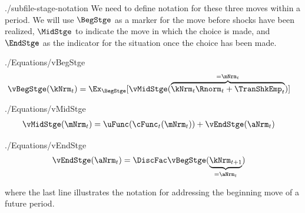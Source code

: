 \documentclass[titlepage, headings=optiontotocandhead]{\econtex}
\providecommand{\stge}{t}\renewcommand{\stge}{t}
\providecommand{\interval}{period}\renewcommand{\interval}{period}
\providecommand{\move}{move}\renewcommand{\move}{move}
\providecommand{\moves}{moves}\renewcommand{\moves}{moves}
\providecommand{\interval}{period}\renewcommand{\interval}{period}
\begin{document}
\begin{verbatimwrite}{./subfile-stage-notation}
  We need to define notation for these three {\moves} within a {\interval}. We will use $\BegStge$ as a marker for the {\move} before shocks have been realized, $\MidStge$ to indicate the move in which the choice is made, and $\EndStge$ as the indicator for the situation once the choice has been made.
\end{verbatimwrite}

\begin{verbatimwrite}{./Equations/vBegStge}
  \begin{equation}\begin{gathered}\begin{aligned}
\vBegStge(\kNrm_{\stge}) & = \Ex_{\BegStge}[\vMidStge(\overbrace{\kNrm_{\stge} \Rnorm_{\stge} + \TranShkEmp_{\stge}}^{=\mNrm_{\stge}})]  \label{eq:vBegStge}
      \end{aligned}\end{gathered}\end{equation}
\end{verbatimwrite}
\unskip
\begin{verbatimwrite}{./Equations/vMidStge}
  \begin{equation}\begin{gathered}\begin{aligned}
\vMidStge(\mNrm_{\stge}) & = \uFunc(\cFunc_{\stge}(\mNrm_{\stge})) + \vEndStge(\aNrm_{\stge}) \label{eq:vMidStge}
      \end{aligned}\end{gathered}\end{equation}
\end{verbatimwrite}
\unskip
\begin{verbatimwrite}{./Equations/vEndStge}
  \begin{equation}\begin{gathered}\begin{aligned}
\vEndStge(\aNrm_{\stge}) & = \DiscFac \vBegStge(\underbrace{\kNrm_{\stge+1}}_{=\aNrm_{\stge}}) \label{eq:vEndStge}
      \end{aligned}\end{gathered}\end{equation}
\end{verbatimwrite}
\unskip
where the last line illustrates the notation for addressing the beginning {\move} of a future {\interval}.

\end{document}
